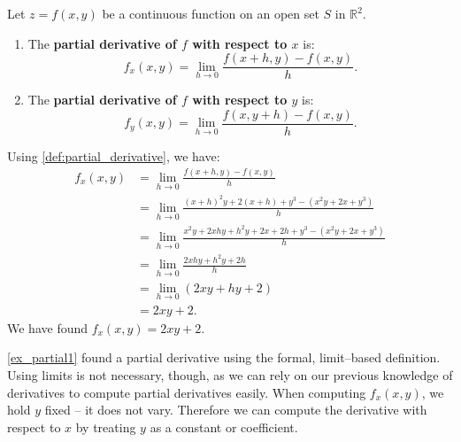 {Let $z=f(x,y)$ be a continuous function on an open set $S$ in $\mathbb{R}^2$.
\begin{enumerate}
	\item The \textbf{partial derivative of $f$ with respect to $x$} is:
	\[f_x(x,y) = \lim_{h\to 0} \frac{f(x+h,y) - f(x,y)}h.\]
	\item The \textbf{partial derivative of $f$ with respect to $y$} is:
	\[f_y(x,y) = \lim_{h\to 0} \frac{f(x,y+h) - f(x,y)}h.\]
	
	\end{enumerate}
	}



{Using \autoref{def:partial_derivative}, we have:
\begin{align*}
f_x(x,y) &= \lim_{h\to 0} \frac{f(x+h,y) - f(x,y)}{h} \\
				&= \lim_{h\to 0} \frac{(x+h)^2y+2(x+h)+y^3 - (x^2y+2x+y^3)}{h}\\
				&= \lim_{h\to 0} \frac{x^2y+2xhy+h^2y+2x+2h+y^3-(x^2y+2x+y^3)}{h}\\
				&= \lim_{h\to 0} \frac{2xhy+h^2y+2h}{h}\\
				&=\lim_{h\to 0}(2xy+hy+2)\\
				&= 2xy+2.
\end{align*}
We have found $f_x(x,y) = 2xy+2$.}

\autoref{ex_partial1} found a partial derivative using the formal, limit--based definition. Using limits is not necessary, though, as we can rely on our previous knowledge of derivatives to compute partial derivatives easily. When computing $f_x(x,y)$, we hold $y$ fixed -- it does not vary. Therefore we can compute the derivative with respect to $x$ by treating $y$ as a constant or coefficient. 

